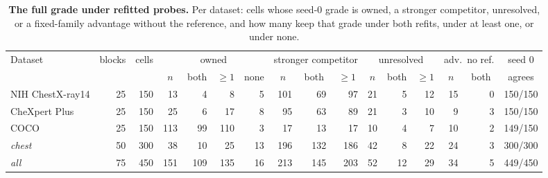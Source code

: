 \begin{table}[h]
\centering
\scriptsize
\setlength{\tabcolsep}{3pt}
\caption{\textbf{The full grade under refitted probes.} Per dataset: cells whose seed-0 grade is owned, a stronger competitor, unresolved, or a fixed-family advantage without the reference, and how many keep that grade under both refits, under at least one, or under none.}
\label{tab:cf-refit}
\begin{tabular}{lrrrrrrrrrrrrrrr}
\toprule
\multirow{2}{*}{Dataset} & \multirow{2}{*}{blocks} & \multirow{2}{*}{cells} & \multicolumn{4}{c}{owned} & \multicolumn{3}{c}{stronger competitor} & \multicolumn{3}{c}{unresolved} & \multicolumn{2}{c}{adv.\ no ref.} & \multicolumn{1}{c}{seed 0}\\
\cmidrule(lr){4-7}\cmidrule(lr){8-10}\cmidrule(lr){11-13}\cmidrule(lr){14-15}
 &  &  & \multicolumn{1}{c}{$n$} & \multicolumn{1}{c}{both} & \multicolumn{1}{c}{$\geq1$} & \multicolumn{1}{c}{none} & \multicolumn{1}{c}{$n$} & \multicolumn{1}{c}{both} & \multicolumn{1}{c}{$\geq1$} & \multicolumn{1}{c}{$n$} & \multicolumn{1}{c}{both} & \multicolumn{1}{c}{$\geq1$} & \multicolumn{1}{c}{$n$} & \multicolumn{1}{c}{both} & \multicolumn{1}{c}{agrees}\\
\midrule
NIH ChestX-ray14 & 25 & 150 & 13 & 4 & 8 & 5 & 101 & 69 & 97 & 21 & 5 & 12 & 15 & 0 & 150/150 \\
CheXpert Plus & 25 & 150 & 25 & 6 & 17 & 8 & 95 & 63 & 89 & 21 & 3 & 10 & 9 & 3 & 150/150 \\
COCO & 25 & 150 & 113 & 99 & 110 & 3 & 17 & 13 & 17 & 10 & 4 & 7 & 10 & 2 & 149/150 \\
\textit{chest} & 50 & 300 & 38 & 10 & 25 & 13 & 196 & 132 & 186 & 42 & 8 & 22 & 24 & 3 & 300/300 \\
\textit{all} & 75 & 450 & 151 & 109 & 135 & 16 & 213 & 145 & 203 & 52 & 12 & 29 & 34 & 5 & 449/450 \\
\bottomrule
\end{tabular}
\end{table}

